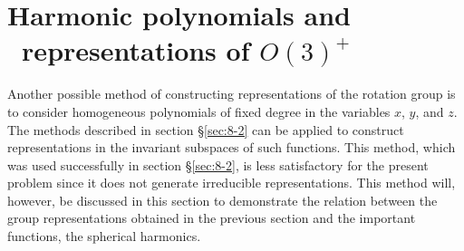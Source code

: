 \section[Harmonic polynomials and representations of $O(3)^{+}$]{Harmonic polynomials and \\\qquad \ representations of $O(3)^{+}$}

Another possible method of constructing representations of the rotation group is to consider homogeneous polynomials of fixed degree in the variables $x$, $y$, and $z$. The methods described in section \S \eqref{sec:8-2} can be applied to construct representations in the invariant subspaces of such functions.	This method, which was used successfully in section \S \eqref{sec:8-2}, is less satisfactory for the present problem since it does not generate irreducible representations. This method will, however, be discussed in this section to demonstrate the relation between the group representations obtained in the previous section and the important functions, the spherical harmonics.

